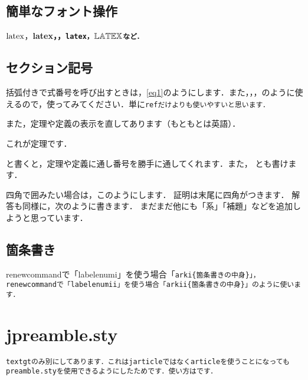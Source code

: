 \documentclass[a4paper, 9pt]{jsarticle}
\begin{document}
\subsection{簡単なフォント操作}
$\rm{latex}$，\bf{latex}，，\tt{latex}，$\bb{LATEX}$など．
\subsection{セクション記号}
括弧付きで式番号を呼び出すときは，\ref{eq1}のようにします．また，，，のように使えるので，使ってみてください．単に\tt{ref}だけよりも使いやすいと思います．\par 
また，定理や定義の表示を直してあります（もともとは英語）．
\begin{theorem}
	これが定理です．
\end{theorem}
と書くと，定理や定義に通し番号を勝手に通してくれます．また，
とも書けます．\par 
四角で囲みたい場合は，このようにします．
証明は末尾に四角がつきます．
解答も同様に，次のように書きます．
まだまだ他にも「系」「補題」などを追加しようと思っています．
\subsection{箇条書き}
renewcommandで「labelenumi」を使う場合「\tt{arki}\{箇条書きの中身\}」，renewcommandで「labelenumii」を使う場合「\tt{arkii}\{箇条書きの中身\}」のように使います．
\section{jpreamble.sty}
\tt{textgt}のみ別にしてあります．これは\tt{jarticle}ではなく\tt{article}を使うことになっても\tt{preamble.sty}を使用できるようにしたためです．使い方はです．
\end{document}
